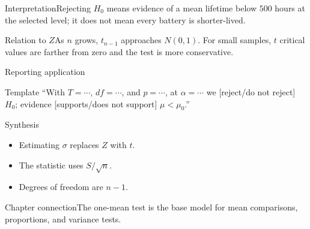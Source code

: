\documentclass[10pt,aspectratio=169]{beamer}
\begin{document}
\begin{frame}{Interpretation}\small Rejecting $H_0$ means evidence of a mean lifetime below $500$ hours at the selected level; it does not mean every battery is shorter-lived.\end{frame}
\begin{frame}{Relation to $Z$}\small As $n$ grows, $t_{n-1}$ approaches $N(0,1)$. For small samples, $t$ critical values are farther from zero and the test is more conservative.\end{frame}
\begin{frame}{Reporting application}\small\begin{block}{Template} ``With $T=\cdots$, $df=\cdots$, and $p=\cdots$, at $\alpha=\cdots$ we [reject/do not reject] $H_0$; evidence [supports/does not support] $\mu<\mu_0$.''\end{block}\end{frame}
\begin{frame}{Synthesis}\small\begin{itemize}\item Estimating $\sigma$ replaces $Z$ with $t$.\item The statistic uses $S/\sqrt n$.\item Degrees of freedom are $n-1$.\end{itemize}\end{frame}
\begin{frame}{Chapter connection}\small The one-mean test is the base model for mean comparisons, proportions, and variance tests.\end{frame}
\end{document}
